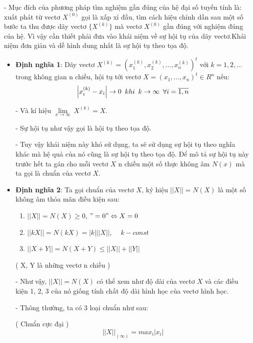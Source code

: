 \documentclass[12pt,a4paper]{article}
\begin{document}
- Mục đích của phương pháp tìm nghiệm gần đúng của hệ đại số tuyến tính là: xuất phát từ vectơ $X^{(0)}$ gọi là xấp xỉ đầu, tìm cách hiệu chỉnh dần sau một số bước ta thu được dãy vectơ $\{X^{(k)}\}$ mà vectơ $X^{(0)}$ gần đúng với nghiệm đúng của hệ. Vì vậy cần thiết phải đưa vào khái niệm về sự hội tụ của dãy vectơ.Khái niệm đơn giản và dễ hình dung nhất là {\color{red}sự hội tụ theo tọa độ}.
\begin{itemize}
\item {\textbf{Định nghĩa 1}: Dãy vectơ $X^{(k)} = (x_1^{(k)}, x_2^{(k)}, ..., x_n^{(k)})^t$ với $k = 1, 2,...$ trong không gian n chiều, hội tụ tới vectơ $X = (x_1, ... ,x_n)^t \in R^n$ nếu: \\}
$$\left| x_i^{(k)} - x_i \right| \rightarrow 0 \enskip khi \enskip k \rightarrow \infty \enskip \forall i = \overline{1,n}$$

- Và kí hiệu ${\lim }\limits_{x \to \infty } \ X^{(k)} = X$.

- Sự hội tụ như vậy gọi là {\color{red}hội tụ theo tọa độ}.

- Tuy vậy khái niệm này khó sử dụng, ta sẽ sử dụng sự hội tụ theo nghĩa khác mà hệ quả của nó cũng là sự hội tụ theo tọa độ. Để mô tả sự hội tụ này trước hết ta gán cho mỗi vectơ $X$ n chiều một số thực không âm $N(x)$ mà ta gọi là chuẩn của vectơ $X$. 

\item{\textbf{Định nghĩa 2}: Ta gọi {\color{red}chuẩn của vectơ $X$}, ký hiệu $||X|| = N(X) $ là một số không âm thỏa mãn điều kiện sau: }
\begin{enumerate}
\item {$||X|| = N(X) \geq 0$, $"= 0" \Leftrightarrow X = 0$}
\item {$||kX|| = N(kX) = |k|||X||$, $\quad k - const$}
\item {$||X + Y|| = N(X + Y) \leq ||X|| + ||Y||$}
\end{enumerate}

( X, Y là những vectơ n chiều )

- Như vậy, $||X|| = N(X)$ có thể xem như độ dài của vectơ $X$ và các điều kiện 1, 2, 3 của nó giống tính chất độ dài hình học của vectơ hình học.

- Thông thường, ta có 3 loại chuẩn như sau:

{\color{red}( Chuẩn cực đại )} $$ ||X||_{(\infty)} = max_i {|x_i|} $$ 


\end{itemize}
\end{document}
